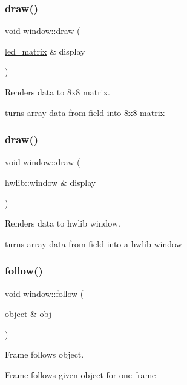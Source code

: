 \subsubsection{\texorpdfstring{draw()}{draw()}\hspace{0.1cm}{\footnotesize\ttfamily [2/3]}}
{\footnotesize\ttfamily void window\+::draw (\begin{DoxyParamCaption}\item[{\hyperlink{classled__matrix}{led\+\_\+matrix} \&}]{display }\end{DoxyParamCaption})}



Renders data to 8x8 matrix. 

turns array data from field into 8x8 matrix \mbox{\label{classwindow_a398eefc89f338540648fa779de957921}} 
\subsubsection{\texorpdfstring{draw()}{draw()}\hspace{0.1cm}{\footnotesize\ttfamily [3/3]}}
{\footnotesize\ttfamily void window\+::draw (\begin{DoxyParamCaption}\item[{hwlib\+::window \&}]{display }\end{DoxyParamCaption})}



Renders data to hwlib window. 

turns array data from field into a hwlib window \mbox{\label{classwindow_ae668127fa0e1ad8946dcac6a620042b7}} 
\subsubsection{\texorpdfstring{follow()}{follow()}}
{\footnotesize\ttfamily void window\+::follow (\begin{DoxyParamCaption}\item[{\hyperlink{classobject}{object} \&}]{obj }\end{DoxyParamCaption})}



Frame follows object. 

Frame follows given object for one frame \mbox{\label{classwindow_a83a6b8a998e102def39d0c827d99b48e}} 
